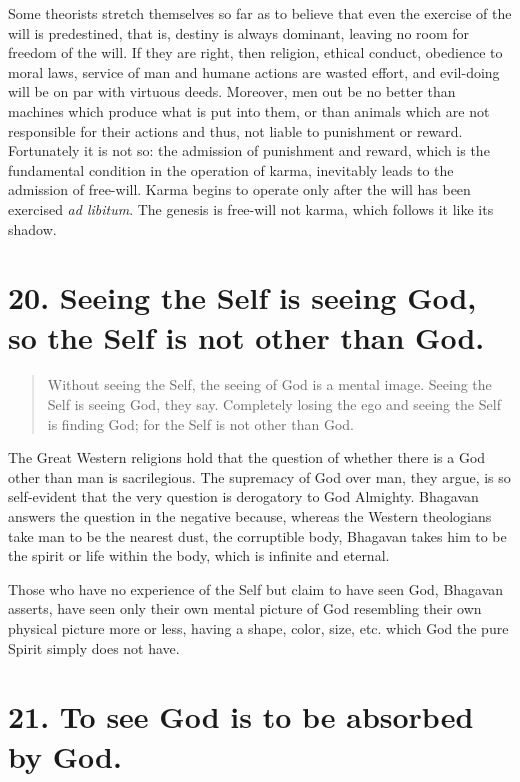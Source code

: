 \documentclass[12pt]{report}
\begin{document}
Some theorists stretch themselves so far as to believe that even the
exercise of the will is predestined, that is, destiny is always
dominant, leaving no room for freedom of the will. If they are right,
then religion, ethical conduct, obedience to moral laws, service of
man and humane actions are wasted effort, and evil-doing will be on
par with virtuous deeds. Moreover, men out be no better than machines
which produce what is put into them, or than animals which are not
responsible for their actions and thus, not liable to punishment or
reward. Fortunately it is not so: the admission of punishment and
reward, which is the fundamental condition in the operation of karma,
inevitably leads to the admission of free-will. Karma begins to
operate only after the will has been exercised \emph{ad libitum}. The
genesis is free-will not karma, which follows it like its shadow.

\section{20. Seeing the Self is seeing God, so the Self is not other
  than God.}

\begin{quote}
  Without seeing the Self, the seeing of God is a mental image. Seeing
  the Self is seeing God, they say. Completely losing the ego and seeing
  the Self is finding God; for the Self is not other than God.
\end{quote}


The Great Western religions hold that the question of whether there is
a God other than man is sacrilegious. The supremacy of God over man,
they argue, is so self-evident that the very question is derogatory to
God Almighty. Bhagavan answers the question in the negative because,
whereas the Western theologians take man to be the nearest dust, the
corruptible body, Bhagavan takes him to be the spirit or life within
the body, which is infinite and eternal.

Those who have no experience of the Self but claim to have seen God,
Bhagavan asserts, have seen only their own mental picture of God
resembling their own physical picture more or less, having a shape,
color, size, etc. which God the pure Spirit simply does not have.


\section{21. To see God is to be absorbed by God.}
\end{document}
